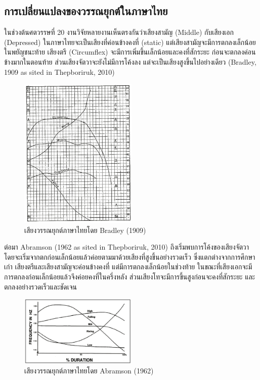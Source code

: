 \documentclass[a4paper]{article}
\begin{document}
\subsection{การเปลี่ยนแปลงของวรรณยุกต์ในภาษาไทย}
    ในช่วงต้นศตวรรษที่ 20 งานวิจัยหลายงานเห็นตรงกันว่าเสียงสามัญ (Middle) กับเสียงเอก (Depressed) ในภาษาไทยจะเป็นเสียงที่ค่อนข้างคงที่ (static) แต่เสียงสามัญจะมีการตกลงเล็กน้อยในพยัญชนะท้าย เสียงตรี (Circumflex) จะมีการเพิ่มขึ้นเล็กน้อยและคงที่สักระยะ ก่อนจะตกลงค่อนข้างมากในตอนท้าย ส่วนเสียงจัตวาจะยังไม่มีการโค้งลง แต่จะเป็นเสียงสูงขึ้นไปอย่างเดียว (Bradley, 1909 as sited in Thepboriruk, 2010)
    \begin{figure}[!ht]
        \begin{center}
        \includegraphics[width=0.5\textwidth]{bradley}
        \end{center}
        \caption{เสียงวรรณยุกต์ภาษาไทยโดย Bradley (1909)}
    \end{figure}

    ต่อมา Abramson (1962 as sited in Thepboriruk, 2010) ถึงเริ่มพบการโค้งของเสียงจัตวา โดยจะเริ่มจากตกก่อนเล็กน้อยแล้วค่อยตามมาด้วยเสียงที่สูงขึ้นอย่างรวดเร็ว ซึ่งแตกต่างจากการศึกษาเก่า เสียงตรีและเสียงสามัญจะค่อนข้างคงที่ แต่มีการตกลงเล็กน้อยในช่วงท้าย ในขณะที่เสียงเอกจะมีการตกลงก่อนเล็กน้อยแล้วจึงค่อยคงที่ในครึ่งหลัง ส่วนเสียงโทจะมีการขึ้นสูงก่อนจะคงที่สักระยะ และตกลงอย่างรวดเร็วและชัดเจน
    \begin{figure}[!ht]
        \begin{center}
        \includegraphics[width=0.5\textwidth]{abramson}
        \end{center}
        \caption{เสียงวรรณยุกต์ภาษาไทยโดย Abramson (1962)}
    \end{figure}
\end{document}
